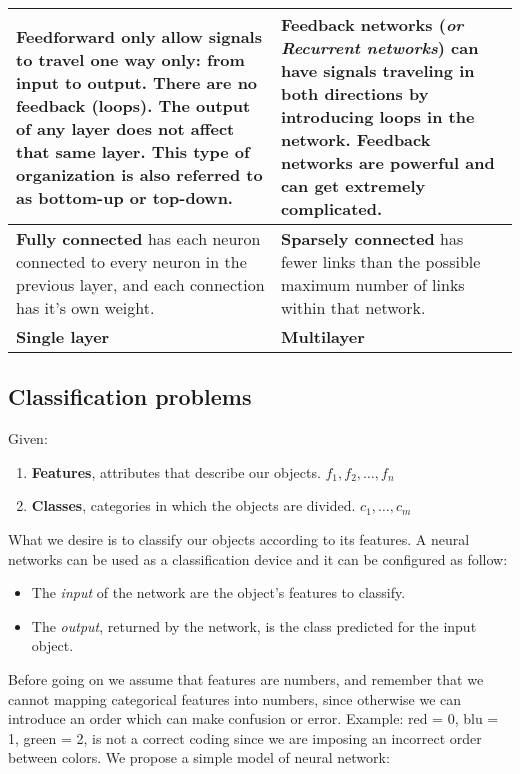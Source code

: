 \begin{table}[H]
	\centering
	\begin{tabular}{| p{7.5cm} | p{7.5cm} |}
		\hline
		\textbf{Feedforward only} allow signals to travel one way only: from input to output. There are no feedback (loops). The output of any layer does not affect that same layer. This type of organization is also referred to as bottom-up or top-down. & \textbf{Feedback networks} (\textit{or Recurrent networks}) can have signals traveling in both directions by introducing loops in the network. Feedback networks are powerful and can get extremely complicated.\\
		\hline
		\textbf{Fully connected} has each neuron connected to every neuron in the previous layer, and each connection has it's own weight. & \textbf{Sparsely connected} has fewer links than the possible maximum number of links within that network.  \\
		\hline
		\textbf{Single layer} & \textbf{Multilayer}\\
		\hline
	\end{tabular}
\end{table} 
\subsection{Classification problems}
Given:
\begin{enumerate}
	\item \textbf{Features}, attributes that describe our objects. $f_1,f_2,\dots,f_n$
	\item \textbf{Classes}, categories in which the objects are divided. $c_1,\dots,c_m$
\end{enumerate}
What we desire is to classify our objects according to its features. A neural networks can be used as a classification device and it can be configured as follow:
\begin{itemize}
	\item The \textit{input} of the network are the object's features to classify.
	\item The \textit{output}, returned by the network, is the class predicted for the input object.
\end{itemize}
Before going on we assume that features are numbers, and remember that we cannot mapping categorical features into numbers, since otherwise we can introduce an order which can make confusion or error. Example: red = 0, blu = 1, green = 2, is not a correct coding since we are imposing an incorrect order between colors. We propose a simple model of neural network:

